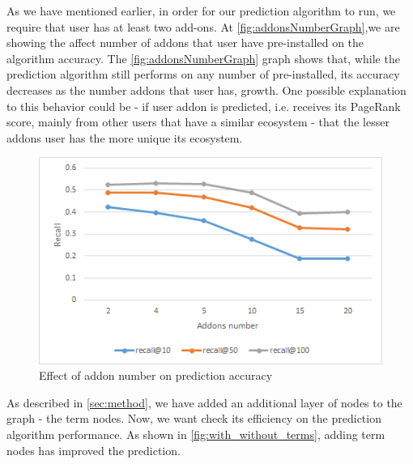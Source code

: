 \documentclass[11pt,oneside]{book}
\begin{document}
As we have mentioned earlier, in order for our prediction algorithm to run, we require that user has at least two add-ons. At \autoref{fig:addonsNumberGraph},we are showing the affect number of addons that user have pre-installed on the algorithm accuracy. The \autoref{fig:addonsNumberGraph} graph shows that, while the prediction algorithm still performs on any number of pre-installed, its accuracy decreases as the number addons that user has, growth. One possible explanation to this behavior could be - if user addon is predicted, i.e. receives its PageRank score, mainly from other users that have a similar ecosystem - that the lesser addons user has the more unique its ecosystem.

\begin{figure}[p]
\centering
\includegraphics[scale=1,angle=0]{figures/addonsNumberGraph.png}
\caption{Effect of addon number on prediction accuracy}
\label{fig:addonsNumberGraph}
\end{figure}


As described in \autoref{sec:method}, we have added an additional layer of nodes to the graph - the term nodes. Now, we want check its efficiency on the prediction algorithm performance. As shown in \autoref{fig:with_without_terms}, adding term nodes has improved the prediction.
\end{document}
